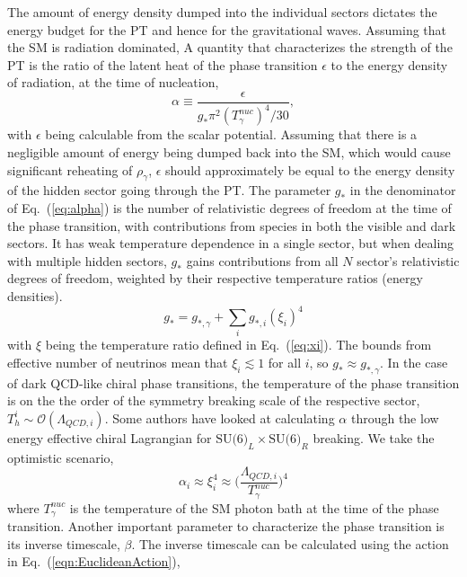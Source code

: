 \documentclass[nofootinbib,twocolumn,preprintnumbers]{revtex4-1}
\begin{document}
The amount of energy density dumped into the individual sectors dictates the energy budget for the PT and hence for the gravitational waves. Assuming that the SM is radiation dominated, A quantity that characterizes the strength of the PT is the ratio of the latent heat of the phase transition $\epsilon$ to the energy density of radiation, at the time of nucleation,
\begin{equation}
\alpha     \equiv  \frac{\epsilon}{g_{*} \pi^2 (T^{nuc}_{\gamma})^4/30},
\label{eq:alpha}
\end{equation}
with $\epsilon$ being calculable from the scalar potential. Assuming that there is a negligible amount of energy being dumped back into the SM, which would cause significant reheating of $\rho_{\gamma}$,  $\epsilon$ should approximately be equal to the energy density of the hidden sector going through the PT. 
The parameter $g_{*}$ in the denominator of Eq.~(\ref{eq:alpha}) is the number of relativistic degrees of freedom at the time of the phase transition, with contributions from species in both the visible and dark sectors. It has weak temperature dependence in a single sector, but when dealing with multiple hidden sectors, $g_{*}$ gains contributions from all $N$ sector's relativistic degrees of freedom, weighted by their respective temperature ratios (energy densities).
\begin{equation}\label{eqn:RelaDOF}
g_{*} = g_{*,\gamma} + \sum_{i} g_{*,i} (\xi_{i})^4
\end{equation}
with $\xi$ being the temperature ratio defined in Eq.~(\ref{eq:xi}). The bounds from effective number of neutrinos mean that $\xi_i \lesssim 1$ for all $i$, so $g_{*} \approx g_{*,\gamma}$. In the case of dark QCD-like chiral  phase transitions, the temperature of the phase transition is on the the order of the symmetry breaking scale of the respective sector, $T_{h}^{i} \sim \mathcal{O}(\Lambda_{QCD,i})$. Some authors \cite{bai, etc} have looked at calculating $\alpha$ through the low energy effective chiral Lagrangian for $\textrm{SU(6)}_{L} \times \textrm{SU(6)}_{R}$ breaking. We take the optimistic scenario, 
%
\begin{equation}
\alpha_i \approx \xi_i^{4} \approx \bigg( \frac{\Lambda_{QCD,i}}{T_{\gamma}^{nuc}}\bigg)^4
\end{equation}
%
where $T_{\gamma}^{nuc}$ is the temperature of the SM photon bath at the time of the phase transition. Another important parameter to characterize the phase transition is its inverse timescale, $\beta$. The inverse timescale can be calculated using the action in Eq.~(\ref{eqn:EuclideanAction}), 
\end{document}
